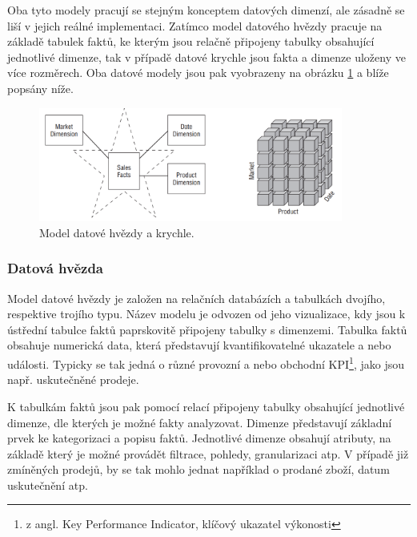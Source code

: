 \documentclass[
  digital,     %
  twoside,     %
  lof,         %
  lot,         %
]{fithesis4}
\begin{document}
Oba tyto modely pracují se stejným konceptem datových dimenzí, ale zásadně se liší v jejich reálné implementaci. Zatímco model datového hvězdy pracuje na základě  tabulek faktů, ke kterým jsou relačně připojeny tabulky obsahující jednotlivé dimenze, tak v případě datové krychle jsou fakta a dimenze uloženy ve více rozměrech.\parencite[s.9]{Kimball2013} Oba datové modely jsou pak vyobrazeny na obrázku \ref{fig:star_olap} a blíže popsány níže. 
\begin{figure}[h]
  \begin{center}
          \includegraphics[width=10cm]{img/star_olap.png}
  \end{center}
  \caption{Model datové hvězdy a krychle.  \parencite[s.9]{Kimball2013}}
  \label{fig:star_olap}
\end{figure}  

\subsubsection{Datová hvězda}
Model datové hvězdy je založen na relačních databázích a tabulkách dvojího, respektive trojího typu. Název modelu je odvozen od jeho vizualizace, kdy jsou k ústřední tabulce faktů paprskovitě připojeny tabulky s dimenzemi. Tabulka faktů obsahuje numerická data, která představují kvantifikovatelné ukazatele a nebo události.\parencite[s.10]{Kimball2013} Typicky se tak jedná o různé provozní a nebo obchodní KPI\footnote{z angl. Key Performance Indicator, klíčový ukazatel výkonosti}, jako jsou např. uskutečněné prodeje.

K tabulkám faktů jsou pak pomocí relací připojeny tabulky obsahující jednotlivé dimenze, dle kterých je možné fakty analyzovat. Dimenze představují základní prvek ke kategorizaci a popisu faktů. Jednotlivé dimenze obsahují atributy, na základě který je možné provádět filtrace, pohledy, granularizaci atp. V případě již zmíněných prodejů, by se tak mohlo jednat například o prodané zboží, datum uskutečnění atp.
\end{document}
